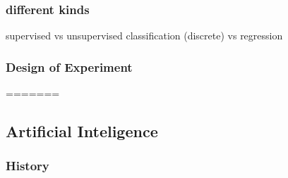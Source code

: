 \subsubsection{different kinds} 
supervised vs unsupervised
classification (discrete) vs regression
\subsubsection{Design of Experiment}
=======
\subsection{Artificial Inteligence}
\subsubsection{History}

